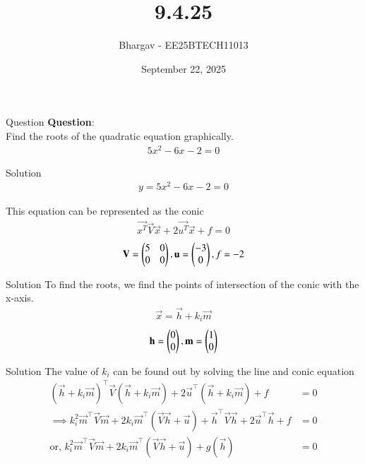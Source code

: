 \documentclass{beamer}
\title{9.4.25}
\date{September 22, 2025}
\author{Bhargav - EE25BTECH11013}
\begin{document}
\frame{\titlepage}

\begin{frame}{Question}
\textbf{Question}: \\
Find the roots of the quadratic equation graphically.
\begin{align}
5x^2 - 6x - 2 = 0
\end{align}
\end{frame}

\begin{frame}{Solution}
\begin{align}
y = 5x^2 - 6x - 2 = 0
\end{align}

This equation can be represented as the conic
\begin{align}
\vec{x^T}\vec{V}\vec{x} + 2\vec{u^T}\vec{x} + f = 0
\end{align}
\begin{align}
\mathbf{V} = \begin{pmatrix}5 & 0 \\ 0 & 0\end{pmatrix}, \mathbf{u} = \begin{pmatrix}-3 \\ 0\end{pmatrix}, f = -2
\end{align}
\end{frame}

\begin{frame}{Solution}
To find the roots, we find the points of intersection of the conic with the x-axis.
\begin{align}
\vec{x} = \vec{h} + k_i\vec{m}    
\end{align}
\begin{align}
\mathbf{h}=\begin{pmatrix}0 \\ 0\end{pmatrix}, \mathbf{m} = \begin{pmatrix}1 \\ 0\end{pmatrix}
\end{align}
\end{frame}

\begin{frame}{Solution}
The value of $k_i$ can be found out by solving the line and conic equation
\begin{align}
(\vec{h} + k_i \vec{m})^{\top} \vec{V} (\vec{h} + k_i \vec{m}) + 2\vec{u}^{\top} (\vec{h} + k_i \vec{m}) + f &= 0 \\
\implies k_i^{2} \vec{m}^{\top}\vec{V}\vec{m} + 2k_i \vec{m}^{\top} (\vec{V}\vec{h} + \vec{u}) + \vec{h}^{\top}\vec{V}\vec{h} + 2\vec{u}^{\top}\vec{h} + f &= 0 \\
\text{or, } k_i^{2} \vec{m}^{\top}\vec{V}\vec{m} + 2k_i \vec{m}^{\top} (\vec{V}\vec{h} + \vec{u}) + g(\vec{h}) &= 0
\end{align}
\end{frame}
\end{document}
